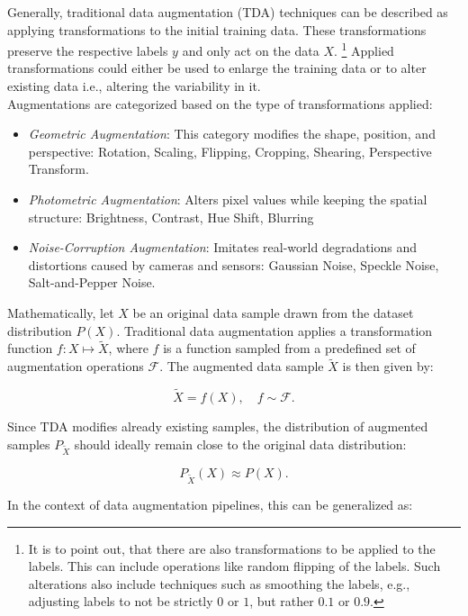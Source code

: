 
Generally, traditional data augmentation (TDA) techniques can be described as applying transformations to the initial training data. These transformations preserve the respective labels \(y\) and only act on the data \(X\). \footnote{It is to point out, that there are also transformations to be applied to the labels. This can include operations like random flipping of the labels. Such alterations also include techniques such as smoothing the labels, e.g., adjusting labels to not be strictly $0$ or $1$, but rather $0.1$ or $0.9$.} Applied transformations could either be used to enlarge the training data or to alter existing data i.e., altering the variability in it.\\

Augmentations are categorized based on the type of transformations applied:

\begin{itemize}
    \item \textit{Geometric Augmentation}: This category modifies the shape, position, and perspective: Rotation, Scaling, Flipping, Cropping, Shearing, Perspective Transform.
    \item \textit{Photometric Augmentation}: Alters pixel values while keeping the spatial structure: Brightness, Contrast, Hue Shift, Blurring
    \item \textit{Noise-Corruption Augmentation}: Imitates real-world degradations and distortions caused by cameras and sensors: Gaussian Noise, Speckle Noise, Salt-and-Pepper Noise.
\end{itemize}

\noindent
Mathematically, let \( X \) be an original data sample drawn from the dataset distribution \( P(X) \). Traditional data augmentation applies a transformation function \( f: X \mapsto \tilde{X} \), where \( f \) is a function sampled from a predefined set of augmentation operations \( \mathcal{F} \). The augmented data sample \( \tilde{X} \) is then given by:

\[
\tilde{X} = f(X), \quad f \sim \mathcal{F}.
\]

\noindent
Since TDA modifies already existing samples, the distribution of augmented samples \( P_{\tilde{X}} \) should ideally remain close to the original data distribution:

\[
P_{\tilde{X}}(X) \approx P(X).
\]

\noindent
In the context of data augmentation pipelines, this can be generalized as:

